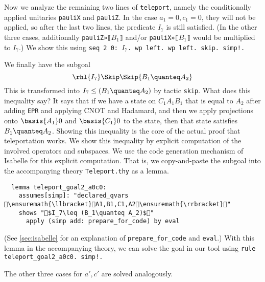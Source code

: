 \documentclass{article}
\begin{document}
Now we analyze the remaining two lines of \texttt{teleport}, namely
the conditionally applied unitaries \texttt{pauliX} and
\texttt{pauliZ}. In the case $a_1=0,c_1=0$,
they will not be applied, so after the last two lines, the predicate
$I_7$
is still satisfied. (In the other three cases, additionally
\texttt{pauliZ»⟦$B_1$⟧}
and/or \texttt{pauliX»⟦$B_1$⟧}
would be multiplied to $I_7$.)
We show this using \texttt{\frenchspacing seq 2 0: $I_7$.
  wp left. wp left. skip. simp!.}

We finally have the subgoal
\[
  \rhl{I_7}\Skip\Skip{B_1\quanteq A_2}
\]
This is transformed into $I_7\leq (B_1\quanteq A_2)$
by tactic \texttt{skip}.  What does this inequality say? It says that
if we have a state on $C_1A_1B_1$
that is equal to $A_2$
after adding \texttt{EPR} and applying CNOT and Hadamard, and then we
apply projections onto $\basis{A_1}0$
and $\basis{C_1}0$ to the state,
then that state satisfies $B_1\quanteq A_2$.
Showing this inequality is the core of the actual proof that teleportation
works. We show this inequality by explicit computation of the involved operators
and subspaces. We use the code generation mechanism of Isabelle for
this explicit computation.  That is, we copy-and-paste
the subgoal into the accompanying theory \texttt{Teleport.thy} as a lemma.
\begin{lstlisting}
  lemma teleport_goal2_a0c0:
    assumes[simp]: "declared_qvars \ensuremath{\llbracket}A1,B1,C1,A2\ensuremath{\rrbracket}"
    shows "$I_7\leq (B_1\quanteq A_2)$"
      apply (simp add: prepare_for_code) by eval
\end{lstlisting}
(See \autoref{sec:isabelle} for an explanation of
\texttt{prepare\_for\_code} and \texttt{eval}.)  With this lemma in
the accompanying theory, we can solve the goal in our tool using
\texttt{\frenchspacing rule teleport\_goal2\_a0c0.  simp!.}

The other three cases for $a',c'$ are solved analogously.
\end{document}
